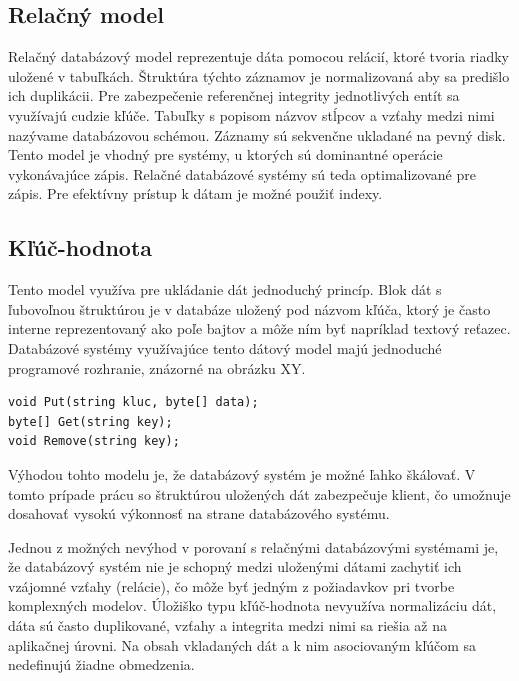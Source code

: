 \documentclass[11pt,twoside,a4paper]{book}
\begin{document}

\subsection{Relačný model}
Relačný databázový model reprezentuje dáta pomocou relácií, ktoré tvoria riadky uložené v tabuľkách. Štruktúra týchto záznamov je normalizovaná aby sa predišlo ich duplikácii. Pre zabezpečenie referenčnej integrity jednotlivých entít sa využívajú cudzie kľúče. Tabuľky s popisom názvov stĺpcov a vzťahy medzi nimi nazývame databázovou schémou. Záznamy sú sekvenčne ukladané na pevný disk. Tento model je vhodný pre systémy, u ktorých sú dominantné operácie vykonávajúce zápis. Relačné databázové systémy sú teda optimalizované pre zápis. Pre efektívny prístup k dátam je možné použiť indexy.

\subsection{Kľúč-hodnota}


Tento model využíva pre ukládanie dát jednoduchý princíp. Blok dát s ľubovoľnou štruktúrou je v databáze uložený pod názvom kľúča, ktorý je často interne reprezentovaný ako poľe bajtov a môže ním byť napríklad textový reťazec. Databázové systémy využívajúce tento dátový model majú jednoduché programové rozhranie, znázorné na obrázku XY.

\begin{verbatim}
void Put(string kluc, byte[] data);
byte[] Get(string key);
void Remove(string key);
\end{verbatim}


Výhodou tohto modelu je, že databázový systém je možné ľahko škálovať. V tomto prípade prácu so štruktúrou uložených dát zabezpečuje klient, čo umožnuje dosahovať vysokú výkonnosť na strane databázového systému.

Jednou z možných nevýhod v porovaní s relačnými databázovými systémami je, že databázový systém nie je schopný medzi uloženými dátami zachytiť ich vzájomné vzťahy (relácie), čo môže byť jedným z požiadavkov pri tvorbe komplexných modelov. Úložiško typu kľúč-hodnota nevyužíva normalizáciu dát, dáta sú často duplikované, vzťahy a integrita medzi nimi sa riešia až na aplikačnej úrovni. Na obsah vkladaných dát a k nim asociovaným kľúčom sa nedefinujú žiadne obmedzenia.
\end{document}

